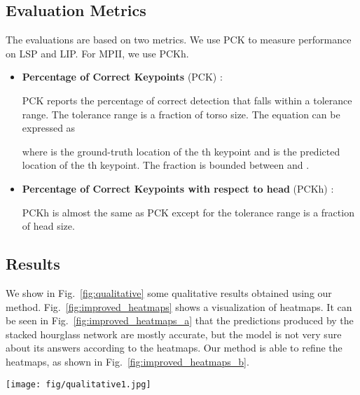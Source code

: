 \documentclass[10pt,twocolumn,letterpaper]{article}
\begin{document}
\subsection{Evaluation Metrics}

The evaluations are based on two metrics. We use PCK to measure performance on LSP and LIP. For MPII, we use PCKh.

\begin{itemize}
\item \textbf{Percentage of Correct Keypoints} (PCK) \cite{YangR11}:

PCK reports the percentage of correct detection that falls within a tolerance range. The tolerance range is a fraction of torso size. The equation can be expressed as

where  is the ground-truth location of the th keypoint and  is the predicted location of the th keypoint. The fraction  is bounded between  and .

\item \textbf{Percentage of Correct Keypoints with respect to head} (PCKh) \cite{AndrilukaPGS14}:

PCKh is almost the same as PCK except for the tolerance range is a fraction of head size.
\end{itemize}


\subsection{Results}

We show in Fig.~\ref{fig:qualitative} some qualitative results obtained using our method. Fig.~\ref{fig:improved_heatmaps} shows a visualization of heatmaps. It can be seen in Fig.~\ref{fig:improved_heatmaps_a} that the predictions produced by the stacked hourglass network \cite{NewellYD16} are mostly accurate, but the model is not very sure about its answers according to the heatmaps. Our method is able to refine the heatmaps, as shown in Fig.~\ref{fig:improved_heatmaps_b}.


 \begin{figure*}
    \centering
    \texttt{[image: fig/qualitative1.jpg]}
    \caption{ Qualitative results. The red and orange lines indicate the left side, and the blue line indicates the right side. Our method can generate more plausible and structural poses than \cite{NewellYD16}.}
    \label{fig:qualitative}
\end{figure*}
 
\end{document}
